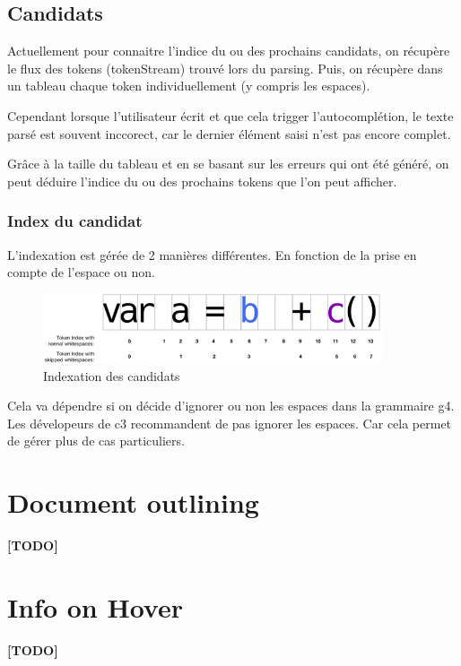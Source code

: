 \documentclass[
    iict, %
    il, %
]{heig-tb}
\begin{document}
\subsection{Candidats}\label{candidates}

Actuellement pour connaitre l'indice du ou des prochains candidats, on récupère le flux des tokens (tokenStream) trouvé lors du parsing.
Puis, on récupère dans un tableau chaque token individuellement (y compris les espaces).

Cependant lorsque l'utilisateur écrit et que cela trigger l'autocomplétion, le texte parsé est souvent inccorect, car le dernier élément saisi n'est pas encore complet.

Grâce à la taille du tableau et en se basant sur les erreurs qui ont été généré, on peut déduire l'indice du ou des prochains tokens que l'on peut afficher.

\subsubsection{Index du candidat}
L'indexation est gérée de 2 manières différentes. En fonction de la prise en compte de l'espace ou non.

\begin{figure}[!ht]
    \begin{center}
        \includegraphics[width=10cm]{assets/figures/candidat-index.png}
    \end{center}
    \caption[Indexation des candidats]{\label{candidat-index} Indexation des candidats}
\end{figure}

Cela va dépendre si on décide d'ignorer ou non les espaces dans la grammaire g4.
Les dévelopeurs de c3 recommandent de pas ignorer les espaces. Car cela permet de gérer plus de cas particuliers.

\section{Document outlining}
\textbf{[TODO]}

\section{Info on Hover}
\textbf{[TODO]}
\end{document}

